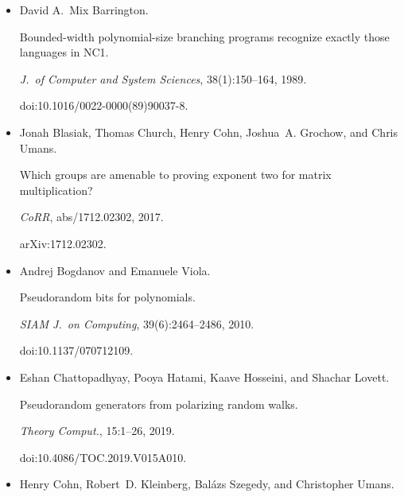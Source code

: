 \documentclass[10pt,a4paper]{article}
\begin{document}
\begin{itemize}
In \emph{37th IEEE Symp. on Foundations of Computer Science (FOCS)},
pages 412–421, 1996.


doi:10.1109/SFCS.1996.548500.





\item[] 
[6]

David A. Mix Barrington.


Bounded-width polynomial-size branching programs recognize exactly
those languages in NC1.


\emph{J. of Computer and System Sciences}, 38(1):150–164, 1989.


doi:10.1016/0022-0000(89)90037-8.





\item[] 
[7]

Jonah Blasiak, Thomas Church, Henry Cohn, Joshua A. Grochow, and Chris Umans.


Which groups are amenable to proving exponent two for matrix
multiplication?


\emph{CoRR}, abs/1712.02302, 2017.


arXiv:1712.02302.





\item[] 
[8]

Andrej Bogdanov and Emanuele Viola.


Pseudorandom bits for polynomials.


\emph{SIAM J. on Computing}, 39(6):2464–2486, 2010.


doi:10.1137/070712109.





\item[] 
[9]

Eshan Chattopadhyay, Pooya Hatami, Kaave Hosseini, and Shachar Lovett.


Pseudorandom generators from polarizing random walks.


\emph{Theory Comput.}, 15:1–26, 2019.


doi:10.4086/TOC.2019.V015A010.





\item[] 
[10]

Henry Cohn, Robert D. Kleinberg, Balázs Szegedy, and Christopher Umans.



\end{itemize}
\end{document}
